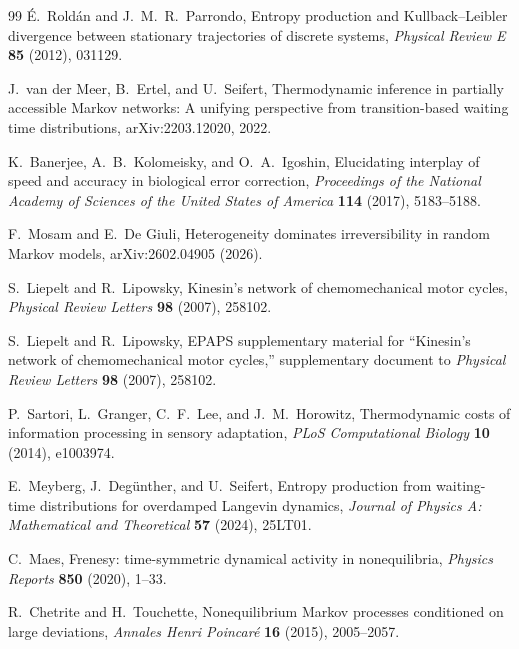 \documentclass[11pt,a4paper]{article}
\numberwithin{equation}{section}
\theoremstyle{thmcompact}
\theoremstyle{remark}
\begin{document}
\begin{thebibliography}{99}
\'E.~Rold\'an and J.~M.~R.~Parrondo,
\newblock Entropy production and Kullback--Leibler divergence between stationary trajectories of discrete systems,
\newblock \emph{Physical Review E} \textbf{85} (2012), 031129.

J.~van der Meer, B.~Ertel, and U.~Seifert,
\newblock Thermodynamic inference in partially accessible Markov networks: A unifying perspective from transition-based waiting time distributions,
\newblock arXiv:2203.12020, 2022.

K.~Banerjee, A.~B.~Kolomeisky, and O.~A.~Igoshin,
\newblock Elucidating interplay of speed and accuracy in biological error correction,
\newblock \emph{Proceedings of the National Academy of Sciences of the United States of America} \textbf{114} (2017), 5183--5188.

F.~Mosam and E.~De Giuli,
\newblock Heterogeneity dominates irreversibility in random Markov models,
\newblock arXiv:2602.04905 (2026).

S.~Liepelt and R.~Lipowsky,
\newblock Kinesin's network of chemomechanical motor cycles,
\newblock \emph{Physical Review Letters} \textbf{98} (2007), 258102.

S.~Liepelt and R.~Lipowsky,
\newblock EPAPS supplementary material for ``Kinesin's network of chemomechanical motor cycles,''
\newblock supplementary document to \emph{Physical Review Letters} \textbf{98} (2007), 258102.

P.~Sartori, L.~Granger, C.~F.~Lee, and J.~M.~Horowitz,
\newblock Thermodynamic costs of information processing in sensory adaptation,
\newblock \emph{PLoS Computational Biology} \textbf{10} (2014), e1003974.

E.~Meyberg, J.~Deg\"unther, and U.~Seifert,
\newblock Entropy production from waiting-time distributions for overdamped Langevin dynamics,
\newblock \emph{Journal of Physics A: Mathematical and Theoretical} \textbf{57} (2024), 25LT01.

C.~Maes,
\newblock Frenesy: time-symmetric dynamical activity in nonequilibria,
\newblock \emph{Physics Reports} \textbf{850} (2020), 1--33.

R.~Chetrite and H.~Touchette,
\newblock Nonequilibrium Markov processes conditioned on large deviations,
\newblock \emph{Annales Henri Poincar\'e} \textbf{16} (2015), 2005--2057.


\end{thebibliography}
\end{document}
